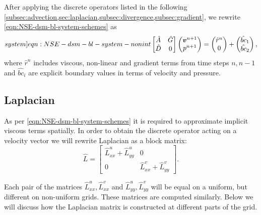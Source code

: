 \documentclass{article}
\numberwithin{equation}{section}
\begin{document}
After applying the discrete operators listed in the following \cref{subsec:advection,sec:laplacian,subsec:divergence,subsec:gradient}, we rewrite \cref{eqn:NSE-dsm-bl-system-schemes}  as
\begin{equation}\label[system]{eqn:NSE-dsm-bl-system-nonint}
	\begin{bmatrix}
		\hat{A} & \hat{G} \\
		\hat{D} & 0
	\end{bmatrix}
	\begin{pmatrix}
		\boldsymbol{v}^{n+1} \\ 
		p^{n+1}
	\end{pmatrix}
	=
	\begin{pmatrix}
		\hat{r}^n \\
		0
	\end{pmatrix}
	+
	\begin{pmatrix}
		\hat{bc}_1\\
		\hat{bc}_2
	\end{pmatrix},
\end{equation}
where $\hat{r}^n$ includes viscous, non-linear and gradient terms from time steps $n,n-1$ and $\hat{bc}_i$ are explicit boundary values in terms of velocity and pressure.


\subsection{Laplacian}\label{sec:laplacian}

As per \cref{eqn:NSE-dsm-bl-system-schemes} it is required to approximate implicit viscous terms spatially. In order to obtain the discrete operator acting on a velocity vector we will rewrite Laplacian as a block matrix:
\begin{equation*}
	\hat L=
	\begin{bmatrix}
  \hat{L}^u_{xx}+\hat{L}^u_{yy} & 0 \\
  0 & \hat{L}^v_{xx}+\hat{L}^v_{yy}
\end{bmatrix}.
\end{equation*}

Each pair of the matrices $\hat{L}^u_{xx},\hat{L}^v_{xx}$ and $\hat{L}^u_{yy},\hat{L}^v_{yy}$ will be equal on a uniform, but different on non-uniform grids. These matrices are computed similarly. Below we will discuss how the Laplacian matrix is constructed at different parts of the grid.
\end{document}
